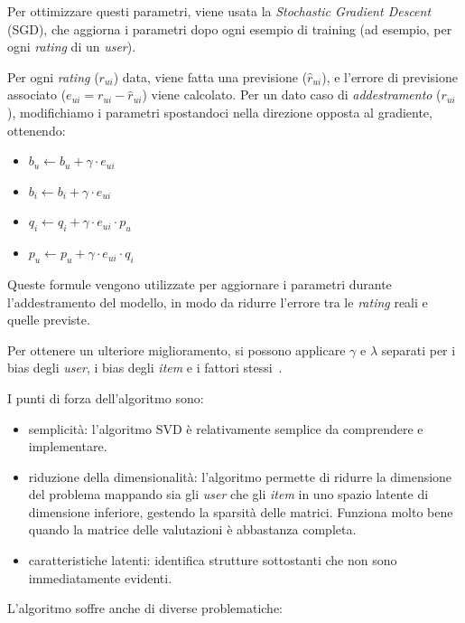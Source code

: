 Per ottimizzare questi parametri, viene usata la \textit{Stochastic Gradient Descent} (SGD), che aggiorna i parametri dopo ogni  esempio di training (ad esempio, per ogni \textit{rating} di un \textit{user}).

Per ogni \textit{rating} ($r_{ui}$) data, viene fatta una previsione ($\hat{r}_{ui}$), e l'errore di previsione associato ($e_{ui} = r_{ui} - \hat{r}_{ui}$) viene calcolato. Per un dato caso di \textit{addestramento} ($r_{ui}$), modifichiamo i parametri spostandoci nella
direzione opposta al gradiente, ottenendo:

\begin{itemize}
    \item $b_u \leftarrow b_u + \gamma \cdot e_{ui}$
    \item $b_i \leftarrow b_i + \gamma \cdot e_{ui}$
    \item $q_i \leftarrow q_i + \gamma \cdot e_{ui} \cdot p_u$
    \item $p_u \leftarrow p_u + \gamma \cdot e_{ui} \cdot q_i$
\end{itemize}

Queste formule vengono utilizzate per aggiornare i parametri durante l'addestramento del modello, in modo da ridurre l'errore tra le
\textit{rating} reali e quelle previste.

Per ottenere un ulteriore miglioramento, si possono applicare $\gamma$ e $\lambda$ separati per i bias degli \textit{user}, i bias degli
\textit{item} e i fattori stessi~\cite{SVD_optimized}.

I punti di forza dell'algoritmo sono:

\begin{itemize}
    \item semplicità: l'algoritmo SVD è relativamente semplice da comprendere e implementare.
    \item riduzione della dimensionalità: l'algoritmo permette di ridurre la dimensione del problema mappando sia gli \textit{user} che gli \textit{item} in uno spazio latente di dimensione inferiore, gestendo la sparsità delle matrici. Funziona molto bene quando la matrice delle valutazioni è abbastanza completa. 
    \item caratteristiche latenti: identifica strutture sottostanti che non sono immediatamente evidenti.
\end{itemize}

L'algoritmo soffre anche di diverse problematiche:

